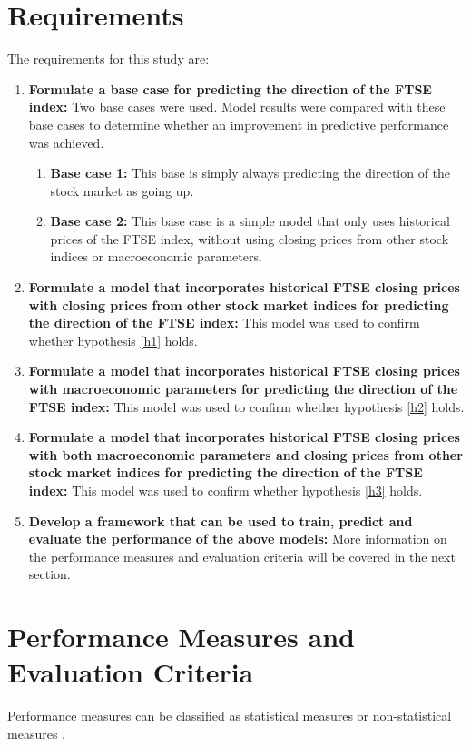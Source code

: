 \documentclass{UoYCSproject}
\begin{document}
\section{Requirements}
\label{sec:requirements}
The requirements for this study are:

\begin{enumerate}
    \item \label{basecase} \textbf{Formulate a base case for predicting the direction of the FTSE index:} Two base cases were used. Model results were compared with these base cases to determine whether an improvement in predictive performance was achieved.  
    \begin{enumerate}
        \item \label{basecase1} \textbf{Base case 1:} This base is simply always predicting the direction of the stock market as going up. 
        \item \label{basecase2} \textbf{Base case 2:} This base case is a simple model that only uses historical prices of the FTSE index, without using closing prices from other stock indices or macroeconomic parameters. 
    \end{enumerate}
    
    \item \textbf{Formulate a model that incorporates historical FTSE closing prices with closing prices from other stock market indices for predicting the direction of the FTSE index:} This model was used to confirm whether hypothesis \ref{h1} holds.
    \item \textbf{Formulate a model that incorporates historical FTSE closing prices with macroeconomic parameters for predicting the direction of the FTSE index:} This model was used to confirm whether hypothesis \ref{h2} holds.
    \item \textbf{Formulate a model that incorporates historical FTSE closing prices with both macroeconomic parameters and closing prices from other stock market indices for predicting the direction of the FTSE index:} This model was used to confirm whether hypothesis \ref{h3} holds.
    \item \label{framework} \textbf{Develop a framework that can be used to train, predict and evaluate the performance of the above models:} More information on the performance measures and evaluation criteria will be covered in the next section. 
\end{enumerate}

\section{Performance Measures and Evaluation Criteria}
Performance measures can be classified as statistical measures or non-statistical measures \cite{atsalakis2009surveying}.
\end{document}
